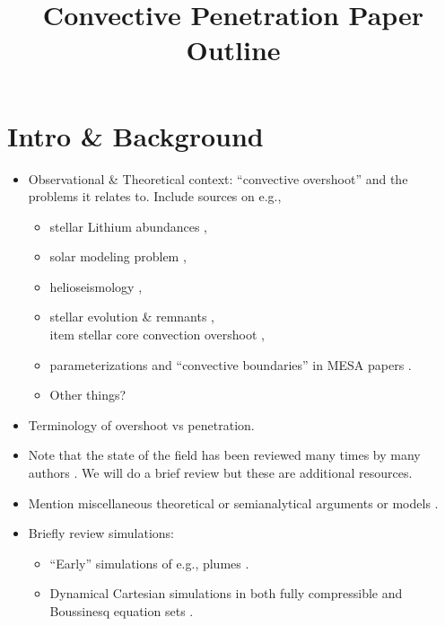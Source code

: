 \documentclass[12pt]{article}
\begin{document}
\title{Convective Penetration Paper Outline}
\maketitle

\section{Intro \& Background}
\begin{itemize}
\item Observational \& Theoretical context: ``convective overshoot'' and the problems it relates to.
Include sources on e.g., 
\begin{itemize}
\item stellar Lithium abundances \citep[][fig 4]{pinsonneault_1997}, 
\item solar modeling problem \citep{basu_antia_2004, bahcall_etal_2005, vinyoles_etal_2017, asplund_etal_2021},
\item helioseismology \citep[][]{christensen-dalsgaard_etal_2011},
\item stellar evolution \& remnants \citep{higgins_vink_2020}, 
\\item stellar core convection overshoot \citep{claret_torres_2018}, 
\item parameterizations \citep{shaviv_salpeter_1973, maeder1975, herwig2000} and ``convective boundaries'' in MESA papers \citep{paxton_etal_2011, paxton_etal_2013, paxton_etal_2018, paxton_etal_2019}. 
\item Other things?
\end{itemize}
\item Terminology of overshoot vs penetration.
\item Note that the state of the field has been reviewed many times by many authors \citep{marcus_etal_1983, zahn1991, browning_etal_2004, rogers_etal_2006, viallet_etal_2015, korre_etal_2019}.
We will do a brief review but these are additional resources.
\item Mention miscellaneous theoretical or semianalytical arguments or models \citep{roxburgh1965, roxburgh1978, roxburgh1989, roxburgh1992, roxburgh1998, marcus_etal_1983, zahn1991, hurlburt_etal_1994, rempel2004, canuto2011, viallet_etal_2015, korre_etal_2019}.
\item Briefly review simulations:
\begin{itemize}
\item ``Early'' simulations of e.g., plumes \citep{schmitt_etal_1984}.
\item Dynamical Cartesian simulations in both fully compressible and Boussinesq equation sets \citep{hurlburt_etal_1994, brummell_etal_2002, rogers_glatzmaier_2005, kapyla_etal_2007, kitiashvili_etal_2016, lecoanet_etal_2016, kapyla_etal_2017, couston_etal_2017, toppaladoddi_wettlaufer_2018}.

\end{itemize}
\end{itemize}
\end{document}
